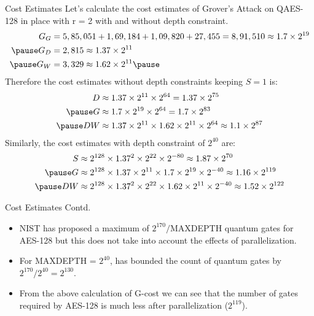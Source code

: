 \begin{frame}{Cost Estimates}
    Let's calculate the cost estimates of Grover's Attack on QAES-128 in place with r = 2 with and without depth constraint.\pause
    \begin{equation*}
    \begin{aligned}
        G_G &= 5,85,051 + 1,69,184 + 1,09,820 + 27,455 = 8,91,510 \approx 1.7 \times 2^{19} \\ \pause
        G_D &= 2,815 \approx 1.37 \times 2^{11} \\ \pause
        G_W &= 3,329 \approx 1.62 \times 2^{11} \pause
    \end{aligned}
\end{equation*}\pause
Therefore the cost estimates without depth constraints keeping $S = 1$ is:\pause
\begin{equation*}
    \begin{aligned}
        D &\approx 1.37 \times 2^{11} \times 2^{64} = 1.37 \times 2^{75} \\ \pause
        G &\approx 1.7 \times 2^{19} \times 2^{64} = 1.7 \times 2^{83} \\\pause
        DW &\approx 1.37\times 2^{11} \times 1.62 \times 2^{11} \times 2^{64} \approx 1.1 \times 2^{87}
    \end{aligned}
\end{equation*}
\pause
Similarly, the cost estimates with depth constraint of $2^{40}$ are: \pause
\begin{equation*}
    \begin{aligned}
        S &\approx 2^{128}\times 1.37^2 \times 2^{22} \times 2^{-80} \approx 1.87 \times 2^{70} \\ \pause
        G &\approx 2^{128} \times 1.37 \times 2^{11} \times 1.7 \times 2^{19} \times 2^{-40} \approx 1.16 \times 2^{119} \\ \pause
        DW &\approx 2^{128} \times 1.37^2 \times 2^{22} \times 1.62 \times 2^{11} \times 2^{-40} \approx 1.52 \times 2^{122} 
    \end{aligned} 
\end{equation*}
\end{frame}
\begin{frame}{Cost Estimates Contd.}
    \begin{itemize}
        \item NIST\cite{nist}  has proposed a maximum of $2^{170}/$MAXDEPTH quantum gates for AES-128 but this does not take into account the effects of parallelization. \pause
        \item For MAXDEPTH = $2^{40}$, \cite{nist} has bounded the count of quantum gates by $2^{170}/2^{40} = 2^{130}$. \pause
        \item From the above calculation of G-cost we can see that the number of gates required by AES-128 is much less after parallelization ($2^{119}$). 
    \end{itemize}
\end{frame}